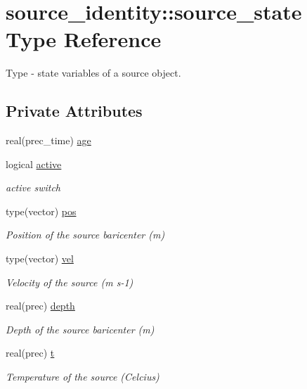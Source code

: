 \hypertarget{structsource__identity_1_1source__state}{}\section{source\+\_\+identity\+:\+:source\+\_\+state Type Reference}
\label{structsource__identity_1_1source__state}


Type -\/ state variables of a source object.  


\subsection*{Private Attributes}
\begin{DoxyCompactItemize}
\item 
real(prec\+\_\+time) \mbox{\hyperlink{structsource__identity_1_1source__state_a311e00a4f1872202e513c0ac498e0619}{age}}
\item 
logical \mbox{\hyperlink{structsource__identity_1_1source__state_ae70b1762af6a3fd60f76226ac858cd6d}{active}}
\begin{DoxyCompactList}\small\item\em active switch \end{DoxyCompactList}\item 
type(vector) \mbox{\hyperlink{structsource__identity_1_1source__state_a070917562792ada99bdb2eaa2b5274e8}{pos}}
\begin{DoxyCompactList}\small\item\em Position of the source baricenter (m) \end{DoxyCompactList}\item 
type(vector) \mbox{\hyperlink{structsource__identity_1_1source__state_aea32db0332ef565f04ab210f5b17dba1}{vel}}
\begin{DoxyCompactList}\small\item\em Velocity of the source (m s-\/1) \end{DoxyCompactList}\item 
real(prec) \mbox{\hyperlink{structsource__identity_1_1source__state_a1986d6dec1ccc5bbfd54e4bbc8f2e4d5}{depth}}
\begin{DoxyCompactList}\small\item\em Depth of the source baricenter (m) \end{DoxyCompactList}\item 
real(prec) \mbox{\hyperlink{structsource__identity_1_1source__state_ac370880f81e096a7aabb9fca144143fb}{t}}
\begin{DoxyCompactList}\small\item\em Temperature of the source (Celcius) \end{DoxyCompactList}\end{DoxyCompactItemize}


